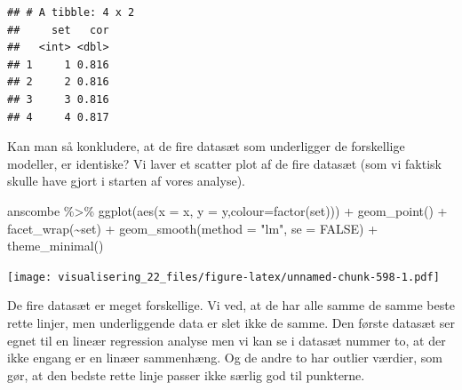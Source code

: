 \documentclass[
]{book}
\newenvironment{Shaded}{\begin{snugshade}}{\end{snugshade}}
\newcommand{\AttributeTok}[1]{\textcolor[rgb]{0.77,0.63,0.00}{#1}}
\newcommand{\ConstantTok}[1]{\textcolor[rgb]{0.00,0.00,0.00}{#1}}
\newcommand{\ErrorTok}[1]{\textcolor[rgb]{0.64,0.00,0.00}{\textbf{#1}}}
\newcommand{\FunctionTok}[1]{\textcolor[rgb]{0.00,0.00,0.00}{#1}}
\newcommand{\NormalTok}[1]{#1}
\newcommand{\OtherTok}[1]{\textcolor[rgb]{0.56,0.35,0.01}{#1}}
\newcommand{\SpecialCharTok}[1]{\textcolor[rgb]{0.00,0.00,0.00}{#1}}
\newcommand{\StringTok}[1]{\textcolor[rgb]{0.31,0.60,0.02}{#1}}
\begin{document}
\begin{Shaded}
\end{Shaded}

\begin{verbatim}
## # A tibble: 4 x 2
##     set   cor
##   <int> <dbl>
## 1     1 0.816
## 2     2 0.816
## 3     3 0.816
## 4     4 0.817
\end{verbatim}

Kan man så konkludere, at de fire datasæt som underligger de forskellige modeller, er identiske? Vi laver et scatter plot af de fire datasæt (som vi faktisk skulle have gjort i starten af vores analyse).

\begin{Shaded}
\begin{Highlighting}[]
\NormalTok{anscombe }\SpecialCharTok{\%\textgreater{}\%} 
  \FunctionTok{ggplot}\NormalTok{(}\FunctionTok{aes}\NormalTok{(}\AttributeTok{x =}\NormalTok{ x, }\AttributeTok{y =}\NormalTok{ y,}\AttributeTok{colour=}\FunctionTok{factor}\NormalTok{(set))) }\SpecialCharTok{+}
  \FunctionTok{geom\_point}\NormalTok{() }\SpecialCharTok{+} 
  \FunctionTok{facet\_wrap}\NormalTok{(}\SpecialCharTok{\textasciitilde{}}\NormalTok{set) }\SpecialCharTok{+}
  \FunctionTok{geom\_smooth}\NormalTok{(}\AttributeTok{method =} \StringTok{"lm"}\NormalTok{, }\AttributeTok{se =} \ConstantTok{FALSE}\NormalTok{) }\SpecialCharTok{+} 
  \FunctionTok{theme\_minimal}\NormalTok{()}
\end{Highlighting}
\end{Shaded}

\texttt{[image: visualisering\_22\_files/figure-latex/unnamed-chunk-598-1.pdf]}

De fire datasæt er meget forskellige. Vi ved, at de har alle samme de samme beste rette linjer, men underliggende data er slet ikke de samme. Den første datasæt ser egnet til en lineær regression analyse men vi kan se i datasæt nummer to, at der ikke engang er en linæer sammenhæng. Og de andre to har outlier værdier, som gør, at den bedste rette linje passer ikke særlig god til punkterne.
\end{document}
